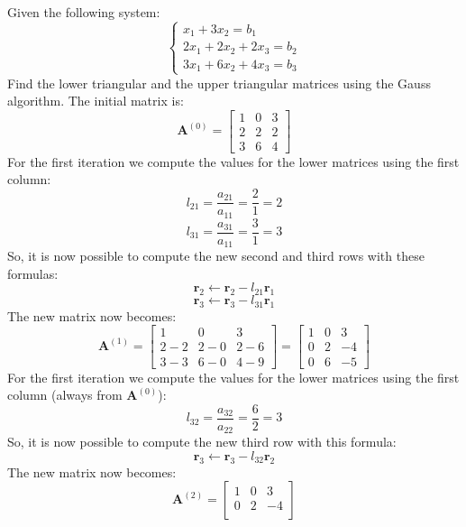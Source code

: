 \documentclass[12pt, a4paper]{report}
\newtheorem[style=M,bodystyle=\normalfont]{theorem}{Theorem}
\newtheorem[style=M,bodystyle=\normalfont]{proposition}{Proposition}
\newtheorem[style=M,bodystyle=\normalfont]{corollary}{Corollary}
\newtheorem[style=M,bodystyle=\normalfont]{lemma}{Lemma}
\newtheorem[style=M,bodystyle=\normalfont]{definition}{Definition}
\begin{document}
    \begin{example}
        Given the following system: 
        \[  \begin{cases}
                x_1+3x_2=b_1 \\
                2x_1+2x_2+2x_3=b_2 \\
                3x_1+6x_2+4x_3=b_3
            \end{cases}\]
        Find the lower triangular and the upper triangular matrices using the Gauss algorithm. The initial matrix is: 
        \[\boldsymbol{A}^{(0)}=            
            \begin{bmatrix}
                1 & 0 & 3 \\
                2 & 2 & 2 \\
                3 & 6 & 4
            \end{bmatrix}\]
        For the first iteration we compute the values for the lower matrices using the first column: 
        \[l_{21}=\dfrac{a_{21}}{a_{11}}=\dfrac{2}{1}=2\]
        \[l_{31}=\dfrac{a_{31}}{a_{11}}=\dfrac{3}{1}=3\]
        So, it is now possible to compute the new second and third rows with these formulas: 
        \[\boldsymbol{r}_2 \leftarrow \boldsymbol{r}_2 - l_{21}\boldsymbol{r}_1\]
        \[\boldsymbol{r}_3 \leftarrow \boldsymbol{r}_3 - l_{31}\boldsymbol{r}_1\]
        The new matrix now becomes: 
        \[\boldsymbol{A}^{(1)}=            
        \begin{bmatrix}
            1 & 0 & 3 \\
            2-2 & 2-0 & 2-6 \\
            3-3 & 6-0 & 4-9
        \end{bmatrix} =
        \begin{bmatrix}
            1 & 0 & 3 \\
            0 & 2 & -4 \\
            0 & 6 & -5
        \end{bmatrix}\]
        For the first iteration we compute the values for the lower matrices using the first column (always from $\boldsymbol{A}^{(0)}$): 
        \[l_{32}=\dfrac{a_{32}}{a_{22}}=\dfrac{6}{2}=3\]
        So, it is now possible to compute the new third row with this formula: 
        \[\boldsymbol{r}_3 \leftarrow \boldsymbol{r}_3 - l_{32}\boldsymbol{r}_2\]
        The new matrix now becomes: 
        \[\boldsymbol{A}^{(2)}=            
        \begin{bmatrix}
            1 & 0 & 3 \\
            0 & 2 & -4 \\

\end{bmatrix}\]
\end{example}
\end{document}
